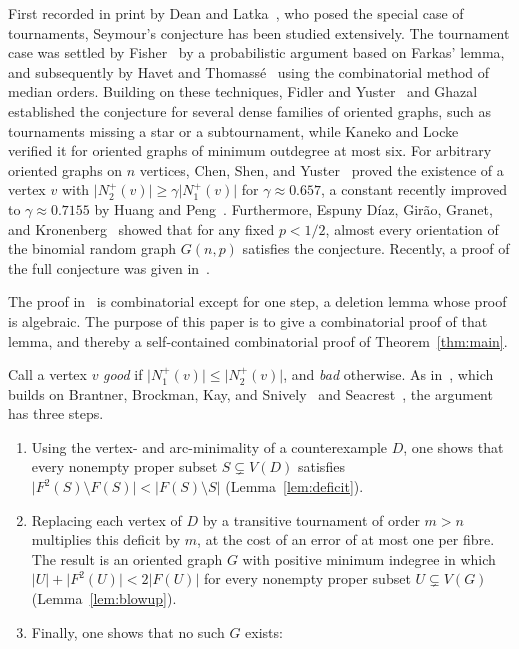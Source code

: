\documentclass[11pt]{amsart}
\theoremstyle{remark}
\newcommand{\abs}[1]{\lvert #1\rvert}
\begin{document}
First recorded in print by Dean and Latka~\cite{DL}, who posed the special case of tournaments, Seymour's conjecture has been studied extensively. The tournament case was settled by Fisher~\cite{Fisher} by a probabilistic argument based on Farkas' lemma, and subsequently by Havet and Thomass\'e~\cite{HT} using the combinatorial method of median orders. Building on these techniques, Fidler and Yuster~\cite{FY} and Ghazal~\cite{Ghazal} established the conjecture for several dense families of oriented graphs, such as tournaments missing a star or a subtournament, while Kaneko and Locke~\cite{KL} verified it for oriented graphs of minimum outdegree at most six. For arbitrary oriented graphs on $n$ vertices, Chen, Shen, and Yuster~\cite{CSY} proved the existence of a vertex $v$ with $\abs{N_2^+(v)}\ge\gamma\abs{N_1^+(v)}$ for $\gamma\approx0.657$, a constant recently improved to $\gamma\approx0.7155$ by Huang and Peng~\cite{HP}. Furthermore, Espuny D\'iaz, Gir\~ao, Granet, and Kronenberg~\cite{EGGK} showed that for any fixed $p<1/2$, almost every orientation of the binomial random graph $G(n,p)$ satisfies the conjecture. Recently, a proof of the full conjecture was given in~\cite{OAI}.

The proof in~\cite{OAI} is combinatorial except for one step, a deletion lemma whose proof is algebraic. The purpose of this paper is to give a combinatorial proof of that lemma, and thereby a self-contained combinatorial proof of Theorem~\ref{thm:main}.

Call a vertex $v$ \emph{good} if $\abs{N_1^+(v)}\le\abs{N_2^+(v)}$, and \emph{bad} otherwise. As in~\cite{OAI}, which builds on Brantner, Brockman, Kay, and Snively~\cite{BBKS} and Seacrest~\cite{Seacrest2019}, the argument has three steps.
\begin{enumerate}[label=(\arabic*)]
\item Using the vertex- and arc-minimality of a counterexample $D$, one shows that every nonempty proper subset $S\subsetneq V(D)$ satisfies $\abs{F^2(S)\setminus F(S)}<\abs{F(S)\setminus S}$ (Lemma~\ref{lem:deficit}).
\item Replacing each vertex of $D$ by a transitive tournament of order $m>n$ multiplies this deficit by $m$, at the cost of an error of at most one per fibre. The result is an oriented graph $G$ with positive minimum indegree in which $\abs U+\abs{F^2(U)}<2\abs{F(U)}$ for every nonempty proper subset $U\subsetneq V(G)$ (Lemma~\ref{lem:blowup}).
\item Finally, one shows that no such $G$ exists:
\end{enumerate}
\end{document}
